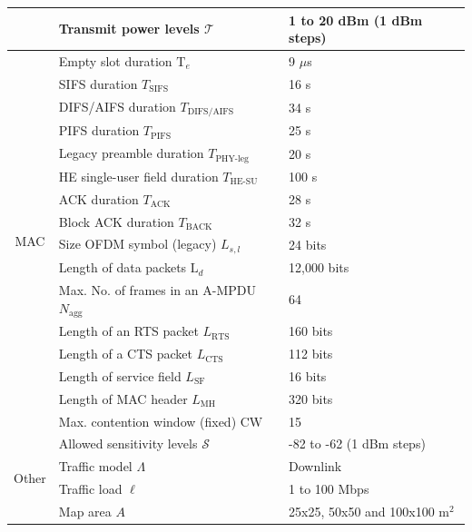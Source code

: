 \documentclass{article}
\begin{document}
\begin{table}[h]
{\begin{tabular}{c|l|l|}
				\cline{2-3}
				\multicolumn{1}{|c|}{} & Transmit power levels $\mathcal{T}$ & 1 to 20 dBm (1 dBm steps) \\
				\hline
				\multicolumn{1}{|c|}{\multirow{16}{*}{MAC}} & Empty slot duration  $\text{T}_e$  & 9 $\mu$s\\ 
				\cline{2-3} 
				\multicolumn{1}{|c|}{} & SIFS duration $T_\text{SIFS}$ & 16 \textmu s  \\
				\cline{2-3} 
				\multicolumn{1}{|c|}{} & DIFS/AIFS duration $T_\text{DIFS/AIFS}$ & 34 \textmu s \\
				\cline{2-3} 
				\multicolumn{1}{|c|}{} & PIFS duration $T_\text{PIFS}$ & 25 \textmu s \\
				\cline{2-3} 
				\multicolumn{1}{|c|}{} & Legacy preamble duration $T_\text{PHY-leg}$ & 20 \textmu s  \\
				\cline{2-3}
				\multicolumn{1}{|c|}{} & HE single-user field duration $T_\text{HE-SU}$ & 100 \textmu s \\
				\cline{2-3} 
				\multicolumn{1}{|c|}{} & ACK duration $T_\text{ACK}$ & 28 \textmu s\\
				\cline{2-3} 
				\multicolumn{1}{|c|}{} & Block ACK duration $T_\text{BACK}$ & 32 \textmu s \\
				\cline{2-3} 
				\multicolumn{1}{|c|}{} & Size OFDM symbol (legacy) $L_{s,l}$ & 24 bits \\
				\cline{2-3} 
				\multicolumn{1}{|c|}{} & Length of data packets $\text{L}_{d}$ & 12,000 bits \\
				\cline{2-3} 
				\multicolumn{1}{|c|}{} & Max. No. of frames in an A-MPDU $N_{\text{agg}}$ & 64 \\
				\cline{2-3} 
				\multicolumn{1}{|c|}{} & Length of an RTS packet $L_\text{RTS}$  & 160 bits \\
				\cline{2-3} 
				\multicolumn{1}{|c|}{} & Length of a CTS packet $L_\text{CTS}$ & 112 bits \\
				\cline{2-3} 
				\multicolumn{1}{|c|}{} & Length of service field $L_\text{SF}$ & 16 bits  \\
				\cline{2-3} 
				\multicolumn{1}{|c|}{} & Length of MAC header $L_\text{MH}$ & 320 bits \\
				\cline{2-3} 
				\multicolumn{1}{|c|}{} & Max. contention window (fixed) $\text{CW}$ & 15 \\
				\cline{2-3} 
				\multicolumn{1}{|c|}{} & Allowed sensitivity levels $\mathcal{S}$ & -82 to -62 (1 dBm steps) \\
				\hline
				\multicolumn{1}{|c|}{\multirow{2}{*}{Other}} & Traffic model $\Lambda$ & Downlink\\
				\cline{2-3} 
				\multicolumn{1}{|c|}{} & Traffic load $\ell$ & 1 to 100 Mbps\\ 
				\cline{2-3} 
				\multicolumn{1}{|c|}{} & Map area $A$ & 25x25, 50x50 and 100x100 $\text{m}^2$\\
				\hline
		\end{tabular}}
		\label{table:parameters}
	\end{table}
	
\end{document}
